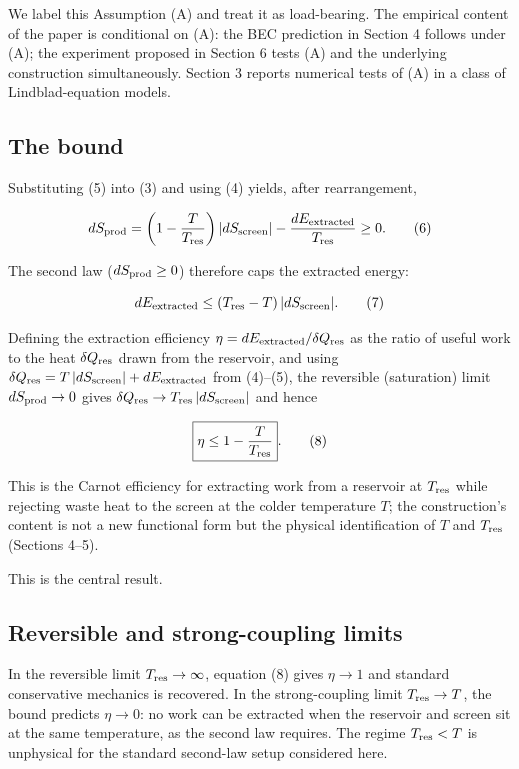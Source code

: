 \documentclass[11pt]{article}
\begin{document}
We label this Assumption (A) and treat it as load-bearing. The empirical content of the paper is conditional on (A): the BEC prediction in Section 4 follows under (A); the experiment proposed in Section 6 tests (A) and the underlying construction simultaneously. Section 3 reports numerical tests of (A) in a class of Lindblad-equation models.

\subsection{The bound}\label{the-bound}

Substituting (5) into (3) and using (4) yields, after rearrangement,

\[dS_{\rm prod} = \left(1 - \frac{T}{T_{\rm res}}\right)|dS_{\rm screen}| - \frac{dE_{\rm extracted}}{T_{\rm res}} \geq 0. \tag{6}\]

The second law (\(dS_{\rm prod} \geq 0\)) therefore caps the extracted energy:

\[dE_{\rm extracted} \leq (T_{\rm res} - T)\,|dS_{\rm screen}|. \tag{7}\]

Defining the extraction efficiency \(\eta = dE_{\rm extracted}/\delta Q_{\rm res}\) as the ratio of useful work to the heat \(\delta Q_{\rm res}\) drawn from the reservoir, and using \(\delta Q_{\rm res} = T\,|dS_{\rm screen}| + dE_{\rm extracted}\) from (4)--(5), the reversible (saturation) limit \(dS_{\rm prod} \to 0\) gives \(\delta Q_{\rm res} \to T_{\rm res}\,|dS_{\rm screen}|\) and hence

\[\boxed{\eta \leq 1 - \frac{T}{T_{\rm res}}}. \tag{8}\]

This is the Carnot efficiency for extracting work from a reservoir at \(T_{\rm res}\) while rejecting waste heat to the screen at the colder temperature \(T\); the construction's content is not a new functional form but the physical identification of \(T\) and \(T_{\rm res}\) (Sections 4--5).

This is the central result.

\subsection{Reversible and strong-coupling limits}\label{reversible-and-strong-coupling-limits}

In the reversible limit \(T_{\rm res} \to \infty\), equation (8) gives \(\eta \to 1\) and standard conservative mechanics is recovered. In the strong-coupling limit \(T_{\rm res} \to T\), the bound predicts \(\eta \to 0\): no work can be extracted when the reservoir and screen sit at the same temperature, as the second law requires. The regime \(T_{\rm res} < T\) is unphysical for the standard second-law setup considered here.
\end{document}
